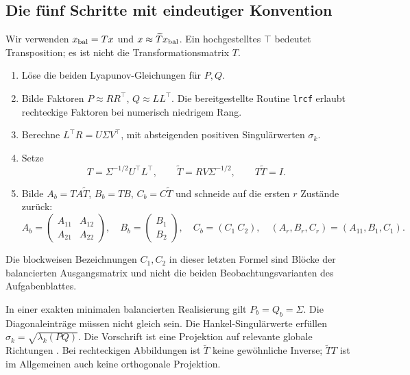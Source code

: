 \subsection{Die fünf Schritte mit eindeutiger Konvention}
Wir verwenden $x_{\rm bal}=Tx$ und $x\approx\widetilde T x_{\rm bal}$. Ein hochgestelltes $\top$ bedeutet Transposition; es ist nicht die Transformationsmatrix $T$.
\begin{enumerate}
\item Löse die beiden Lyapunov-Gleichungen für $P,Q$.
\item Bilde Faktoren $P\approx RR^\top$, $Q\approx LL^\top$. Die bereitgestellte Routine \texttt{lrcf} erlaubt rechteckige Faktoren bei numerisch niedrigem Rang.
\item Berechne $L^\top R=U\Sigma V^\top$, mit absteigenden positiven Singulärwerten $\sigma_k$.
\item Setze
\begin{equation}
 T=\Sigma^{-1/2}U^\top L^\top,\qquad
 \widetilde T=RV\Sigma^{-1/2},\qquad T\widetilde T=I.
\end{equation}
\item Bilde $A_b=TA\widetilde T$, $B_b=TB$, $C_b=C\widetilde T$ und schneide auf die ersten $r$ Zustände zurück:
\begin{equation}
 A_b=\begin{pmatrix}A_{11}&A_{12}\\A_{21}&A_{22}\end{pmatrix},\quad
 B_b=\begin{pmatrix}B_1\\B_2\end{pmatrix},\quad C_b=(C_1\ C_2),\quad
 (A_r,B_r,C_r)=(A_{11},B_1,C_1).
\end{equation}
\end{enumerate}
Die blockweisen Bezeichnungen $C_1,C_2$ in dieser letzten Formel sind Blöcke der balancierten Ausgangsmatrix und nicht die beiden Beobachtungsvarianten des Aufgabenblattes.

In einer exakten minimalen balancierten Realisierung gilt $P_b=Q_b=\Sigma$. Die Diagonaleinträge müssen nicht gleich sein. Die Hankel-Singulärwerte erfüllen $\sigma_k=\sqrt{\lambda_k(PQ)}$. Die Vorschrift ist eine Projektion auf relevante globale Richtungen \cite{benner2023}. Bei rechteckigen Abbildungen ist $\widetilde T$ keine gewöhnliche Inverse; $\widetilde TT$ ist im Allgemeinen auch keine orthogonale Projektion.


